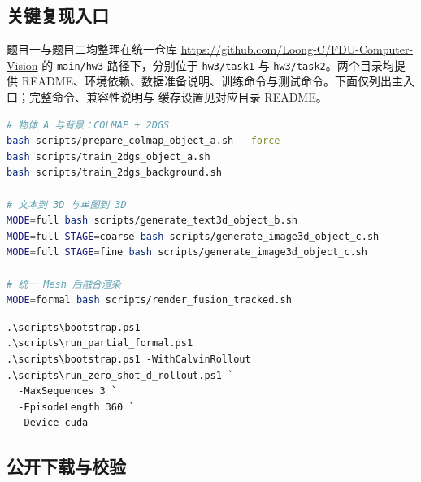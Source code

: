 \documentclass[10pt,a4paper,UTF8,fontset=windows]{ctexart}
\newcommand{\code}[1]{\texttt{\small #1}}
\begin{document}
\subsection{关键复现入口}

题目一与题目二均整理在统一仓库 \url{https://github.com/Loong-C/FDU-Computer-Vision} 的
\code{main/hw3} 路径下，分别位于 \code{hw3/task1} 与 \code{hw3/task2}。两个目录均提供
README、环境依赖、数据准备说明、训练命令与测试命令。下面仅列出主入口；完整命令、兼容性说明与
缓存设置见对应目录 README。

\begin{lstlisting}[language=bash,caption={题目一主要复现入口。}]
# 物体 A 与背景：COLMAP + 2DGS
bash scripts/prepare_colmap_object_a.sh --force
bash scripts/train_2dgs_object_a.sh
bash scripts/train_2dgs_background.sh

# 文本到 3D 与单图到 3D
MODE=full bash scripts/generate_text3d_object_b.sh
MODE=full STAGE=coarse bash scripts/generate_image3d_object_c.sh
MODE=full STAGE=fine bash scripts/generate_image3d_object_c.sh

# 统一 Mesh 后融合渲染
MODE=formal bash scripts/render_fusion_tracked.sh
\end{lstlisting}

\begin{lstlisting}[language={},caption={题目二主要复现入口（PowerShell）。}]
.\scripts\bootstrap.ps1
.\scripts\run_partial_formal.ps1
.\scripts\bootstrap.ps1 -WithCalvinRollout
.\scripts\run_zero_shot_d_rollout.ps1 `
  -MaxSequences 3 `
  -EpisodeLength 360 `
  -Device cuda
\end{lstlisting}

\subsection{公开下载与校验}
\end{document}
